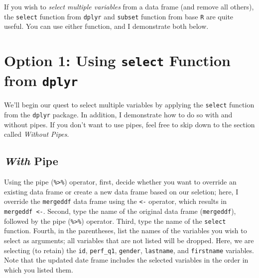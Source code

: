 \documentclass[]{book}
\newenvironment{Shaded}{\begin{snugshade}}{\end{snugshade}}
\newcommand{\KeywordTok}[1]{\textcolor[rgb]{0.13,0.29,0.53}{\textbf{#1}}}
\newcommand{\StringTok}[1]{\textcolor[rgb]{0.31,0.60,0.02}{#1}}
\newcommand{\CommentTok}[1]{\textcolor[rgb]{0.56,0.35,0.01}{\textit{#1}}}
\newcommand{\OperatorTok}[1]{\textcolor[rgb]{0.81,0.36,0.00}{\textbf{#1}}}
\newcommand{\NormalTok}[1]{#1}
\begin{document}
If you wish to \emph{select multiple variables} from a data frame (and
remove all others), the \texttt{select} function from \texttt{dplyr} and
\texttt{subset} function from base \texttt{R} are quite useful. You can
use either function, and I demonstrate both below.

\section{\texorpdfstring{Option 1: Using \texttt{select} Function from
\texttt{dplyr}}{Option 1: Using select Function from dplyr}}\label{option-1-using-select-function-from-dplyr}

We'll begin our quest to select multiple variables by applying the
\texttt{select} function from the \texttt{dplyr} package. In addition, I
demonstrate how to do so with and without pipes. If you don't want to
use pipes, feel free to skip down to the section called \emph{Without
Pipes}.

\subsection{\texorpdfstring{\emph{With}
Pipe}{With Pipe}}\label{with-pipe}

Using the pipe (\texttt{\%\textgreater{}\%}) operator, first, decide
whether you want to override an existing data frame or create a new data
frame based on our seletion; here, I override the \texttt{mergeddf} data
frame using the \texttt{\textless{}-} operator, which results in
\texttt{mergeddf\ \textless{}-}. Second, type the name of the original
data frame (\texttt{mergeddf}), followed by the pipe
(\texttt{\%\textgreater{}\%}) operator. Third, type the name of the
\texttt{select} function. Fourth, in the parentheses, list the names of
the variables you wish to select as arguments; all variables that are
not listed will be dropped. Here, we are selecting (to retain) the
\texttt{id}, \texttt{perf\_q1}, \texttt{gender}, \texttt{lastname}, and
\texttt{firstname} variables. Note that the updated date frame includes
the selected variables in the order in which you listed them.

\begin{Shaded}
\end{Shaded}
\end{document}
